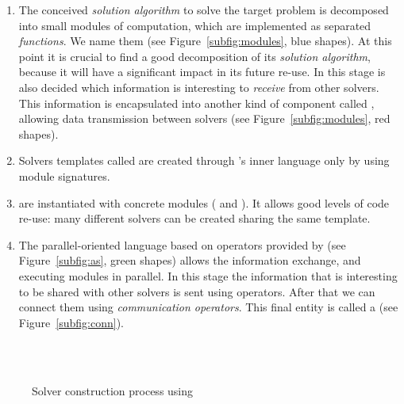 \begin{enumerate}
\item The conceived \textit{solution algorithm} to solve the target problem is decomposed into small modules of computation, which are implemented as separated {\it functions}. We name them \oms{} (see Figure~\ref{subfig:modules}, blue shapes). At this point it is crucial to find a good decomposition of its \textit{solution algorithm}, because it will have a significant impact in its future re-use. In this stage is also decided which information is interesting to \textit{receive} from other solvers. This information is encapsulated into another kind of component called \opch, allowing data transmission between solvers (see Figure~\ref{subfig:modules}, red shapes).
\item Solvers templates called \INTROass{} are created through \posl{}'s inner language only by using module signatures. 
\item \Ass{} are instantiated with concrete modules (\oms{} and \opchs). It allows good levels of code re-use: many different solvers can be created sharing the same template. %
\item The parallel-oriented language based on operators provided by \posl{} (see Figure~\ref{subfig:as}, green shapes) allows the information exchange, and executing modules in parallel. In this stage the information that is interesting to be shared with other solvers is sent using operators. After that we can connect them using {\it communication operators}. This final entity is called a \INTROsoset{} (see Figure~\ref{subfig:conn}).
\end{enumerate}

\begin{figure}[h]
	\centering
	\\
	\\
	\caption[]{Solver construction process using \posl}
	\label{fig:posl}
\end{figure}


